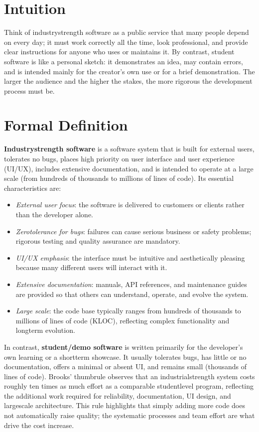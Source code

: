 \documentclass[12pt, a4paper]{article}
\begin{document}
\section{Intuition}
Think of industrystrength software as a public service that many people depend on every day; it must work correctly all the time, look professional, and provide clear instructions for anyone who uses or maintains it. By contrast, student software is like a personal sketch: it demonstrates an idea, may contain errors, and is intended mainly for the creator's own use or for a brief demonstration. The larger the audience and the higher the stakes, the more rigorous the development process must be.  

\section{Formal Definition}
\textbf{Industrystrength software} is a software system that is built for external users, tolerates no bugs, places high priority on user interface and user experience (UI/UX), includes extensive documentation, and is intended to operate at a large scale (from hundreds of thousands to millions of lines of code).  Its essential characteristics are:  

\begin{itemize}
  \item \emph{External user focus}: the software is delivered to customers or clients rather than the developer alone.
  \item \emph{Zerotolerance for bugs}: failures can cause serious business or safety problems; rigorous testing and quality assurance are mandatory.
  \item \emph{UI/UX emphasis}: the interface must be intuitive and aesthetically pleasing because many different users will interact with it.
  \item \emph{Extensive documentation}: manuals, API references, and maintenance guides are provided so that others can understand, operate, and evolve the system.
  \item \emph{Large scale}: the code base typically ranges from hundreds of thousands to millions of lines of code (KLOC), reflecting complex functionality and longterm evolution.
\end{itemize}

In contrast, \textbf{student/demo software} is written primarily for the developer's own learning or a shortterm showcase.  It usually tolerates bugs, has little or no documentation, offers a minimal or absent UI, and remains small (thousands of lines of code).  Brooks' thumbrule observes that an industrialstrength system costs roughly ten times as much effort as a comparable studentlevel program, reflecting the additional work required for reliability, documentation, UI design, and largescale architecture.  This rule highlights that simply adding more code does not automatically raise quality; the systematic processes and team effort are what drive the cost increase.  
\end{document}
